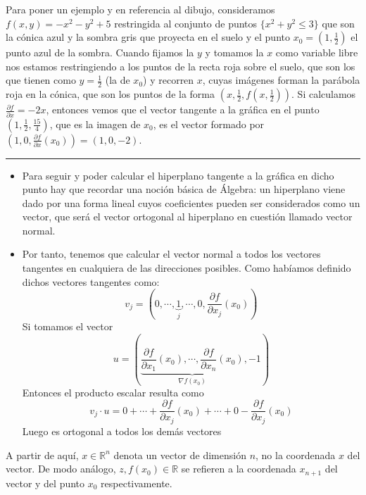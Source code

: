 \documentclass[10pt,a4paper,openright]{book}
\theoremstyle{break}
\begin{document}
Para poner un ejemplo y en referencia al dibujo, consideramos $f(x,y) = -x^2-y^2+5$ restringida al conjunto de puntos $\{x^2+y^2 \leq 3\}$ que son la cónica azul y la sombra gris que proyecta en el suelo y el punto $x_0= \left(1,\frac{1}{2}\right)$ el punto azul de la sombra. Cuando fijamos la $y$ y tomamos la $x$ como variable libre nos estamos restringiendo a los puntos de la recta roja sobre el suelo, que son los que tienen como $y=\frac{1}{2}$ (la de $x_0$) y recorren $x$, cuyas imágenes forman la parábola roja en la cónica, que son los puntos de la forma $\left(x,\frac{1}{2}, f\left( x,\frac{1}{2}\right)\right)$. Si calculamos $\frac{\partial f}{\partial x} = -2x$, entonces vemos que el vector tangente a la gráfica en el punto $(1, \frac{1}{2}, \frac{15}{4})$, que es la imagen de $x_0$, es el vector formado por $\left(1, 0, \frac{\partial f}{\partial x}(x_0)\right) = \left(1, 0, -2\right)$.
\hrule
\begin{itemize}
\item Para seguir y poder calcular el hiperplano tangente a la gráfica en dicho punto hay que recordar una noción básica de Álgebra: un hiperplano viene dado por una forma lineal cuyos coeficientes pueden ser considerados como un vector, que será el vector ortogonal al hiperplano en cuestión llamado vector normal.
\item Por tanto, tenemos que calcular el vector normal a todos los vectores tangentes en cualquiera de las direcciones posibles. Como habíamos definido dichos vectores tangentes como:
$$v_j = \left(0, \cdots, \underbrace{1}_{j}, \cdots, 0, \frac{\partial f}{\partial x_j}(x_0)\right)$$
Si tomamos el vector
$$u = \left(\underbrace{\frac{\partial f}{\partial x_1}(x_0),\cdots, \frac{\partial f}{\partial x_n}(x_0)}_{\nabla f(x_0)}, -1 \right)$$
Entonces el producto escalar resulta como
$$v_j\cdot u = 0 + \cdots + \frac{\partial f}{\partial x_j}(x_0) + \cdots + 0 - \frac{\partial f}{\partial x_j}(x_0)$$
Luego es ortogonal a todos los demás vectores
\end{itemize}
A partir de aquí, $x\in \mathbb{R}^n$ denota un vector de dimensión $n$, no la coordenada $x$ del vector. De modo análogo, $z, f(x_0)\in \mathbb R$ se refieren a la coordenada $x_{n+1}$ del vector y del punto $x_0$ respectivamente.
\end{document}
